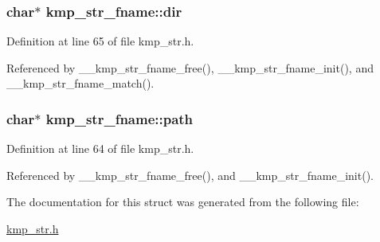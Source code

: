 \hypertarget{structkmp__str__fname_a5f67b7b74f3c8ee34b6a9cc6b2fc9e91}{
\subsubsection[{dir}]{\setlength{\rightskip}{0pt plus 5cm}char$\ast$ kmp\-\_\-str\-\_\-fname\-::dir}}\label{structkmp__str__fname_a5f67b7b74f3c8ee34b6a9cc6b2fc9e91}


Definition at line 65 of file kmp\-\_\-str.\-h.



Referenced by \-\_\-\-\_\-kmp\-\_\-str\-\_\-fname\-\_\-free(), \-\_\-\-\_\-kmp\-\_\-str\-\_\-fname\-\_\-init(), and \-\_\-\-\_\-kmp\-\_\-str\-\_\-fname\-\_\-match().

\hypertarget{structkmp__str__fname_a513f711d0851cc50629dbd7bcd9b4ccd}{
\subsubsection[{path}]{\setlength{\rightskip}{0pt plus 5cm}char$\ast$ kmp\-\_\-str\-\_\-fname\-::path}}\label{structkmp__str__fname_a513f711d0851cc50629dbd7bcd9b4ccd}


Definition at line 64 of file kmp\-\_\-str.\-h.



Referenced by \-\_\-\-\_\-kmp\-\_\-str\-\_\-fname\-\_\-free(), and \-\_\-\-\_\-kmp\-\_\-str\-\_\-fname\-\_\-init().



The documentation for this struct was generated from the following file\-:\begin{DoxyCompactItemize}
\item 
\hyperlink{kmp__str_8h}{kmp\-\_\-str.\-h}\end{DoxyCompactItemize}
